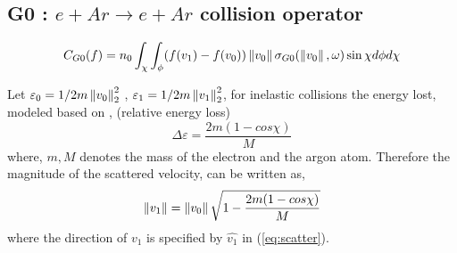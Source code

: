 \documentclass{article}[draft]
\begin{document}
%




\subsection{G0 : $e + Ar \rightarrow e + Ar$ collision operator}
\begin{equation}
    C_{G0}(f) = n_0 \int_{\chi} \int_{\phi} (f(v_1) - f(v_0)) \left\lVert v_0\right\rVert \sigma_{G0}(\left\lVert v_0\right\rVert,\omega) \sin\chi d\phi d\chi
\end{equation}

Let $\varepsilon_0 = 1/2 m \left\lVert v_0\right\rVert^2_2$ , $\varepsilon_1 = 1/2 m \left\lVert v_1\right\rVert^2_2$, for inelastic collisions the energy lost, modeled based on \cite{vahedi1995monte}, (relative energy loss)
\begin{equation}
    \Delta \varepsilon = \frac{2m(1-cos\chi)}{M}
\end{equation} where, $m,M$ denotes the mass of the electron and the argon atom. Therefore the magnitude of the scattered velocity, can be written as, 
\begin{equation}
    \left\lVert v_1\right\rVert = \left\lVert v_0\right\rVert \sqrt{1- \frac{2m(1-cos\chi)}{M}} \label{eq:g0_eloss}
\end{equation} where the direction of $v_1$ is specified by $\hat{v_1}$ in (\ref{eq:scatter}).
\end{document}
